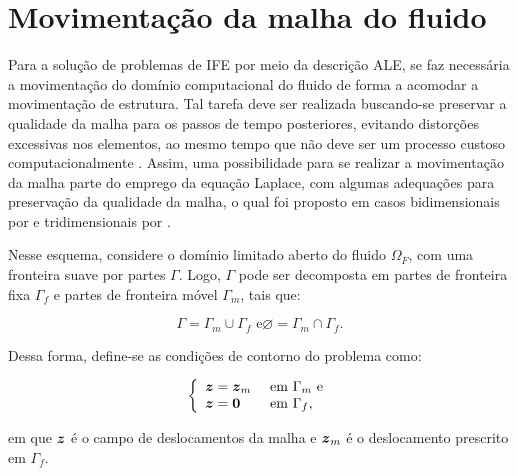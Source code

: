 \section{Movimentação da malha do fluido} \label{MovMalha}

Para a solução de problemas de IFE por meio da descrição ALE, se faz necessária a movimentação do domínio computacional do fluido de forma a acomodar a movimentação de estrutura. Tal tarefa deve ser realizada buscando-se preservar a qualidade da malha para os passos de tempo posteriores, evitando distorções excessivas nos elementos, ao mesmo tempo que não deve ser um processo custoso computacionalmente \cite{kanchi20073d}. Assim, uma possibilidade para se realizar a movimentação da malha parte do emprego da equação Laplace, com algumas adequações para preservação da qualidade da malha, o qual foi proposto em casos bidimensionais por  e tridimensionais por .

Nesse esquema, considere o domínio limitado aberto do fluido $\Omega_F$, com uma fronteira suave por partes $\Gamma$. Logo, $\Gamma$ pode ser decomposta em partes de fronteira fixa $\Gamma_f$ e partes de fronteira móvel $\Gamma_m$, tais que:

\begin{subequations}
    \begin{equation}
        \Gamma=\Gamma_m\cup\Gamma_f\text{ e}
    \end{equation}
    \begin{equation}
        \varnothing=\Gamma_m\cap\Gamma_f\text{.}
    \end{equation}
\end{subequations}

Dessa forma, define-se as condições de contorno do problema como:

\begin{equation}
    \left\{
    \begin{array}{ll}
        \boldsymbol{z}=\boldsymbol{z}_m & \text{ em }\Gamma_m\text{ e} \\
        \boldsymbol{z}=\boldsymbol{0}   & \text{ em }\Gamma_f\text{,}
    \end{array}
    \right.
\end{equation}

\noindent em que $\boldsymbol{z}$ é o campo de deslocamentos da malha e $\boldsymbol{z}_m$ é o deslocamento prescrito em $\Gamma_f$.

